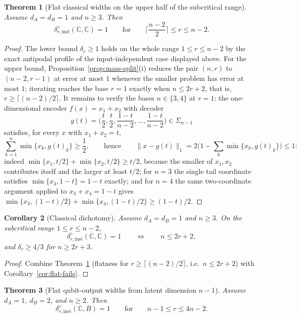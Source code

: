 \documentclass[11pt,a4paper]{article}
\newtheorem{theorem}{Theorem}[section]
\newtheorem{corollary}[theorem]{Corollary}
\begin{document}
\begin{theorem}[Flat classical widths on the upper half of the subcritical range]
\label{thm:flat-half}
Assume $d_A=d_B=1$ and $n\ge3$. Then
\[
\delta_{r,\mathrm{inst}}^{\diamond}(\mathbb C,\mathbb C)=1
\qquad\text{for}\qquad
\Big\lceil\frac{n-2}{2}\Big\rceil\le r\le n-2.
\]
\end{theorem}

\begin{proof}
The lower bound $\delta_r\ge1$ holds on the whole range $1\le r\le n-2$ by the exact
antipodal profile of the input-independent case displayed above. For the upper bound,
Proposition~\ref{prop:mass-split}(i) reduces the pair $(n,r)$ to $(n-2,r-1)$ at error at
most $1$ whenever the smaller problem has error at most $1$; iterating reaches the base
$r=1$ exactly when $n\le2r+2$, that is, $r\ge\lceil(n-2)/2\rceil$. It remains to verify
the bases $n\in\{3,4\}$ at $r=1$: the one-dimensional encoder $f(x)=x_1+x_2$ with
decoder
\[
g(t)=\Big(\frac t2,\frac t2,\frac{1-t}{n-2},\dots,\frac{1-t}{n-2}\Big)\in\Sigma_{n-1}
\]
satisfies, for every $x$ with $x_1+x_2=t$,
\[
\sum_{k=1}^n\min\{x_k,g(t)_k\}\ge\frac12,
\qquad\text{hence}\qquad
\|x-g(t)\|_1=2\Big(1-\sum_k\min\{x_k,g(t)_k\}\Big)\le1:
\]
indeed $\min\{x_1,t/2\}+\min\{x_2,t/2\}\ge t/2$, because the smaller of $x_1,x_2$
contributes itself and the larger at least $t/2$; for $n=3$ the single tail coordinate
satisfies $\min\{x_3,1-t\}=1-t$ exactly; and for $n=4$ the same two-coordinate argument
applied to $x_3+x_4=1-t$ gives
$\min\{x_3,(1-t)/2\}+\min\{x_4,(1-t)/2\}\ge(1-t)/2$.
\end{proof}

\begin{corollary}[Classical dichotomy]
\label{cor:classical-dichotomy}
Assume $d_A=d_B=1$ and $n\ge3$. On the subcritical range $1\le r\le n-2$,
\[
\delta_{r,\mathrm{inst}}^{\diamond}(\mathbb C,\mathbb C)=1
\qquad\Longleftrightarrow\qquad n\le 2r+2,
\]
and $\delta_r\ge4/3$ for $n\ge2r+3$.
\end{corollary}

\begin{proof}
Combine Theorem~\ref{thm:flat-half} (flatness for $r\ge\lceil(n-2)/2\rceil$, i.e.\
$n\le2r+2$) with Corollary~\ref{cor:flat-fails}.
\end{proof}

\begin{theorem}[Flat qubit-output widths from latent dimension $n-1$]
\label{thm:flat-qubit}
Assume $d_A=1$, $d_B=2$, and $n\ge2$. Then
\[
\delta_{r,\mathrm{inst}}^{\diamond}(\mathbb C,B)=1
\qquad\text{for}\qquad n-1\le r\le 4n-2.
\]
\end{theorem}
\end{document}
